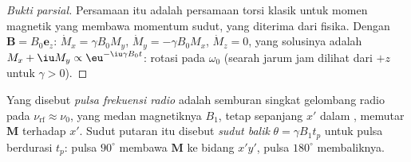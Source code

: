 \begin{proof}[Bukti parsial]
Persamaan itu adalah persamaan torsi klasik untuk momen magnetik yang membawa
momentum sudut, yang diterima dari fisika. Dengan $\mathbf B = B_0\mathbf e_z$:
$\dot M_x = \gamma
B_0M_y$, $\dot M_y = -\gamma B_0M_x$, $\dot M_z = 0$, yang solusinya adalah
$M_x + \iu M_y \propto
\eu^{-\iu\gamma B_0t}$: rotasi pada $\omega_0$ (searah jarum jam dilihat dari $+z$
untuk $\gamma > 0$).
\end{proof}

\begin{definition}\label{def:b3:advanced-nmr:pulse}
Yang disebut \emph{pulsa frekuensi radio} adalah
semburan singkat gelombang radio pada $\nu_{\mathrm{rf}} \approx \nu_0$, yang medan
magnetiknya $B_1$, tetap sepanjang $x'$ dalam , memutar
$\mathbf M$ terhadap $x'$. Sudut putaran itu disebut \emph{sudut
balik} $\theta = \gamma B_1t_p$ untuk pulsa berdurasi $t_p$:
pulsa $90^\circ$ membawa $\mathbf M$ ke bidang $x'y'$, pulsa $180^\circ$
membaliknya.
\end{definition}

